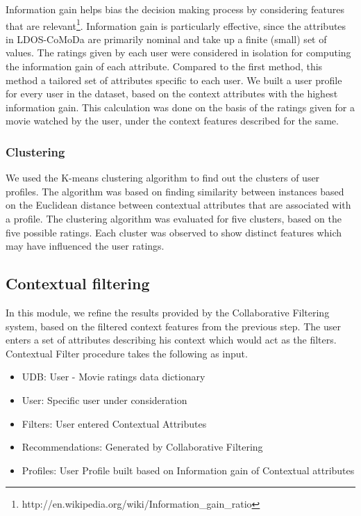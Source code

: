 \documentclass{article}
\begin{document}
Information gain helps bias the decision making process by considering features that are relevant\footnote{http://en.wikipedia.org/wiki/Information_gain_ratio}. Information gain is particularly effective, since the attributes in LDOS-CoMoDa are primarily nominal and take up a finite (small) set of values. The ratings given by each user were considered in isolation for computing the information gain of each attribute. Compared to the first method, this method a tailored set of attributes specific to each user. We built a user profile for every user in the dataset, based on the context attributes with the highest information gain. This calculation was done on the basis of the ratings given for a movie watched by the user, under the context features described for the same.

\subsubsection{Clustering}

 We used the K-means clustering algorithm to find out the clusters of user profiles. The algorithm was based on finding similarity between instances based on the Euclidean distance between contextual attributes that are associated with a profile. The clustering algorithm was evaluated for five clusters, based on the five possible ratings. Each cluster was observed to show distinct features which may have influenced the user ratings.

\subsection{Contextual filtering}
In this module, we refine the results provided by the Collaborative Filtering system, based on the filtered context features from the previous step. The user enters a set of attributes describing his context which would act as the filters. Contextual Filter procedure takes the following as input.

\begin{itemize}
\item UDB: User - Movie ratings data dictionary
\item User: Specific user under consideration 
\item Filters: User entered Contextual Attributes	
\item Recommendations: Generated by Collaborative Filtering
\item Profiles: User Profile built based on Information gain of Contextual attributes
\end{itemize}
\end{document}
